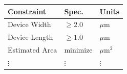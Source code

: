 \documentclass[
]{article}
\begin{document}
\begin{longtable}[]{@{}lll@{}}
\toprule
\begin{minipage}[b]{0.38\columnwidth}\raggedright
Constraint\strut
\end{minipage} & \begin{minipage}[b]{0.27\columnwidth}\raggedright
Spec.\strut
\end{minipage} & \begin{minipage}[b]{0.27\columnwidth}\raggedright
Units\strut
\end{minipage}\tabularnewline
\midrule
\endhead
\begin{minipage}[t]{0.38\columnwidth}\raggedright
Device Width\strut
\end{minipage} & \begin{minipage}[t]{0.27\columnwidth}\raggedright
\(\geq 2.0\)\strut
\end{minipage} & \begin{minipage}[t]{0.27\columnwidth}\raggedright
\(\mu\)m\strut
\end{minipage}\tabularnewline
\begin{minipage}[t]{0.38\columnwidth}\raggedright
Device Length\strut
\end{minipage} & \begin{minipage}[t]{0.27\columnwidth}\raggedright
\(\geq 1.0\)\strut
\end{minipage} & \begin{minipage}[t]{0.27\columnwidth}\raggedright
\(\mu\)m\strut
\end{minipage}\tabularnewline
\begin{minipage}[t]{0.38\columnwidth}\raggedright
Estimated Area\strut
\end{minipage} & \begin{minipage}[t]{0.27\columnwidth}\raggedright
minimize\strut
\end{minipage} & \begin{minipage}[t]{0.27\columnwidth}\raggedright
\(\mu\)m\(^2\)\strut
\end{minipage}\tabularnewline
\begin{minipage}[t]{0.38\columnwidth}\raggedright
\(\vdots\)\strut
\end{minipage} & \begin{minipage}[t]{0.27\columnwidth}\raggedright
\(\vdots\)\strut
\end{minipage} & \begin{minipage}[t]{0.27\columnwidth}\raggedright
\(\vdots\)\strut
\end{minipage}\tabularnewline

\end{longtable}
\end{document}
